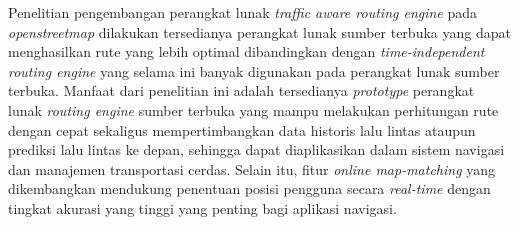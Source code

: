 Penelitian pengembangan perangkat lunak \textit{traffic aware routing engine} pada \textit{openstreetmap} dilakukan tersedianya perangkat lunak sumber terbuka yang dapat menghasilkan rute yang lebih optimal dibandingkan dengan \textit{time-independent routing engine} yang selama ini banyak digunakan pada perangkat lunak sumber terbuka. Manfaat dari penelitian ini adalah tersedianya \textit{prototype} perangkat lunak \textit{routing engine} sumber terbuka yang mampu melakukan perhitungan rute dengan cepat sekaligus mempertimbangkan data historis lalu lintas ataupun prediksi lalu lintas ke depan, sehingga dapat diaplikasikan dalam sistem navigasi dan manajemen transportasi cerdas. Selain itu, fitur \textit{online map-matching} yang dikembangkan mendukung penentuan posisi pengguna secara \textit{real-time} dengan tingkat akurasi yang tinggi yang penting bagi aplikasi navigasi. 